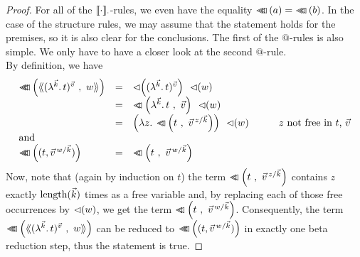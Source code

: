 \documentclass[submission,copyright,creativecommons]{eptcs}
\begin{document}
\begin{proof}
 For all of the $\ev \cdot \cdot$-rules, we even have the equality $\prTree a = \prTree b$. In the case of the structure rules, we may assume that the statement holds for the premises, so it is also clear for the conclusions. The first of the $@$-rules is also simple. We only have to have a closer look at the second $@$-rule.\\
 By definition, we have 
 \[
\begin{array}{lclr}
 \prTree {\tree {\Val {\vec k} t {\vec v}}{w}} & = & \ApA {  \prVal {\Val {\vec k} t {\vec v}}   } \ {\prVal w}  & \\
& = &\ApA {  \pr{\LaO {\vec k} t}{\vec v}   }  \ {\prVal w} \\
& = & \ApA {\left( \LaA z {\pr {t} {\multiinsert {\vec v}{\vec k}{z}}} \right)} \ {\prVal w} &  \qquad \mbox{$z$ not free in $t$, $\vec v$}\\
\mbox{and} &&& \\
 \prTree {    (t , \multiinsert{\vec v}{\vec k}{w} )    } & = & \pr{t}{\multiinsert{\vec v}{\vec k}{w}} &
\end{array}
\]
Now, note that (again by induction on $t$) the term $\pr {t} {\multiinsert {\vec v}{\vec k}{z}}$ contains  $z$ exactly $\length {\vec k}$ times as a free variable and, by replacing each of those free occurrences  by $\prVal w$, we get the term $\pr{t}{\multiinsert{\vec v}{\vec k}{w}}$.
Consequently, the term $\prTree {\tree {\Val {\vec k} t {\vec v}}{w}}$ can be reduced to $\prTree {    (t , \multiinsert{\vec v}{\vec k}{w} )    }$ in exactly one beta reduction step, thus the statement is true. 


\end{proof}
\end{document}
